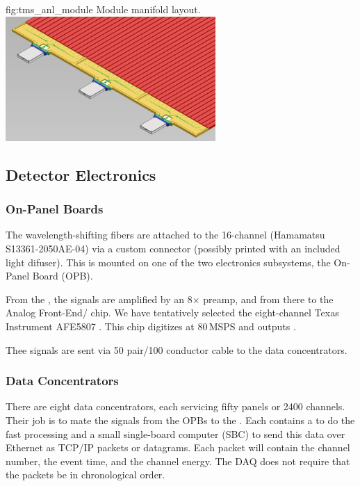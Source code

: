 \begin{dunefigure}{fig:tms_anl_module}
{Module manifold layout.}
\includegraphics[width=0.6\textwidth]{graphics/tms/Detector/tms_anl_module.pdf}
\end{dunefigure}

\subsection{Detector Electronics}
\label{sec:tms-des-electronics}
\subsubsection{On-Panel Boards}
\label{sec:tms-des-elect-OPB}


The wavelength-shifting fibers are attached to the
16-channel  (Hamamatsu S13361-2050AE-04) via a 
custom connector (possibly \threed printed with an included light difuser). This is mounted on one of the two electronics subsystems, the On-Panel Board (OPB).

From the , the signals are amplified by an 8$\times$ preamp,
and from there to the Analog Front-End/ chip. We
have tentatively selected the eight-channel Texas Instrument AFE5807 \cite{AFE5807}.
This chip digitizes at 80\,MSPS and outputs .

Thee  signals are sent via 50 pair/100 conductor cable
to the data concentrators.
 
\subsubsection{Data Concentrators}
\label{sec:tms-des-elect-DC}

There are eight data concentrators, each servicing fifty
panels or 2400 channels. Their job is to mate the
   signals from the OPBs to the . Each contains
a  to do the fast processing and a small single-board
computer (SBC) to send this data over Ethernet as 
TCP/IP packets or  datagrams. Each packet will
contain the channel number, the event time, and the channel
energy. The DAQ does not require that the packets be in  chronological order.

